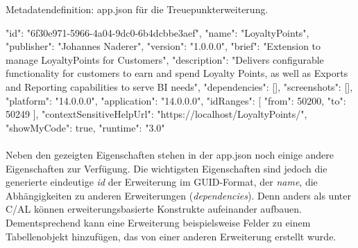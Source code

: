 \begin{program}[H]  %
	\centering
	\caption{Metadatendefinition: app.json für die Treuepunkterweiterung.}
	\label{prog:App.json}
	\begin{JavaCode}
{
	"id": "6f30e971-5966-4a04-9dc0-6b4dcbbe3aef",
	"name": "LoyaltyPoints",
	"publisher": "Johannes Naderer",
	"version": "1.0.0.0",
	"brief": "Extension to manage LoyaltyPoints for Customers",
	"description": "Delivers configurable functionality for customers to earn and spend Loyalty Points, as well as Exports and Reporting capabilities to serve BI needs",
	"dependencies": [],
	"screenshots": [],
	"platform": "14.0.0.0",
	"application": "14.0.0.0",
	"idRanges": [
	{
		"from": 50200,
		"to": 50249
	}
	],
	"contextSensitiveHelpUrl": "https://localhost/LoyaltyPoints/",
	"showMyCode": true,
	"runtime": "3.0"
}
	\end{JavaCode}
\end{program}

\paragraph{}
Neben den gezeigten Eigenschaften stehen in der app.json noch einige andere Eigenschaften zur Verfügung. Die wichtigsten Eigenschaften sind jedoch die generierte eindeutige \textit{id} der Erweiterung im GUID-Format, der \textit{name}, die Abhängigkeiten zu anderen Erweiterungen (\textit{dependencies}). Denn anders als unter C/AL können erweiterungsbasierte Konstrukte aufeinander aufbauen. Dementsprechend kann eine Erweiterung beispielsweise Felder zu einem Tabellenobjekt hinzufügen, das von einer anderen Erweiterung erstellt wurde.

